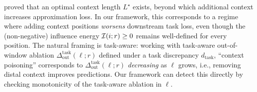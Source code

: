 \citet{Shi2025Entropy} proved that an optimal context length $L^\star$ exists, beyond which additional context increases approximation loss. In our framework, this corresponds to a regime where adding context positions \emph{worsens} downstream task loss, even though the (non-negative) influence energy $\mathcal{I}(i;r) \ge 0$ remains well-defined for every position. The natural framing is task-aware: working with task-aware out-of-window ablation $\Delta_{\mathrm{out}}^{\mathrm{task}}(\ell;r)$ defined under a task discrepancy $d_{\mathrm{task}}$, ``context poisoning'' corresponds to $\Delta_{\mathrm{out}}^{\mathrm{task}}(\ell;r)$ \emph{decreasing} as $\ell$ grows, i.e., removing distal context improves predictions. Our framework can detect this directly by checking monotonicity of the task-aware ablation in $\ell$.
